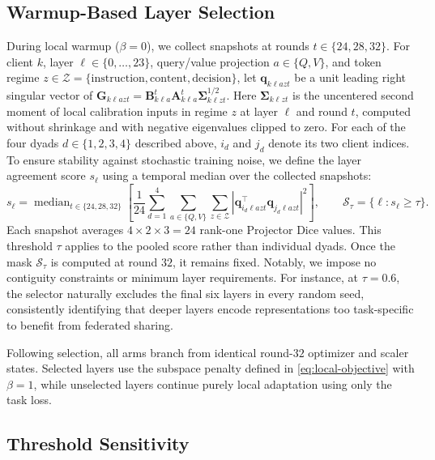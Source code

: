 \documentclass[11pt,letterpaper]{article}
\newcommand{\bA}{\mathbf{A}}
\newcommand{\bB}{\mathbf{B}}
\newcommand{\bG}{\mathbf{G}}
\newcommand{\bSigma}{\boldsymbol{\Sigma}}
\begin{document}
\subsection{Warmup-Based Layer Selection}
During local warmup ($\beta=0$), we collect snapshots at rounds
$t\in\{24,28,32\}$. For client $k$, layer $\ell\in\{0,\ldots,23\}$,
query/value projection $a\in\{Q,V\}$, and token regime
$z\in\mathcal Z=\{\text{instruction},\text{content},\text{decision}\}$,
let $\mathbf q_{k\ell azt}$ be a unit leading right singular vector of
$\bG_{k\ell azt}=\bB_{k\ell a}^{t}\bA_{k\ell a}^{t}
\bSigma_{k\ell zt}^{1/2}$.
Here $\bSigma_{k\ell zt}$ is the uncentered second moment of local
calibration inputs in regime $z$ at layer $\ell$ and round $t$, computed
without shrinkage and with negative eigenvalues clipped to zero.
For each of the four dyads $d\in\{1,2,3,4\}$ described above,
$i_d$ and $j_d$ denote its two client indices.
To ensure stability against stochastic training noise, we define the layer agreement score $s_\ell$ using a temporal median over the collected snapshots:
\begin{equation}
    s_\ell=\operatorname{median}_{t\in\{24,28,32\}}
    \left[\frac{1}{24}\sum_{d=1}^{4}\sum_{a\in\{Q,V\}}\sum_{z\in\mathcal Z}
    \left|\mathbf{q}_{i_d\ell azt}^{\top}\mathbf{q}_{j_d\ell azt}\right|^2\right],
    \qquad
    \mathcal S_\tau=\{\ell:s_\ell\geq\tau\}.
    \label{eq:dddt-selector}
\end{equation}
Each snapshot averages $4\times2\times3=24$ rank-one Projector Dice values.
This threshold $\tau$ applies to the pooled score rather than individual dyads. Once the mask $\mathcal S_\tau$ is computed at round $32$, it remains fixed. Notably, we impose no contiguity constraints or minimum layer requirements. For instance, at $\tau=0.6$, the selector naturally excludes the final six layers in every random seed, consistently identifying that deeper layers encode representations too task-specific to benefit from federated sharing.

Following selection, all arms branch from identical round-$32$ optimizer and scaler states. Selected layers use the subspace penalty defined in \eqref{eq:local-objective} with $\beta=1$, while unselected layers continue purely local adaptation using only the task loss.


\subsection{Threshold Sensitivity}
\end{document}
